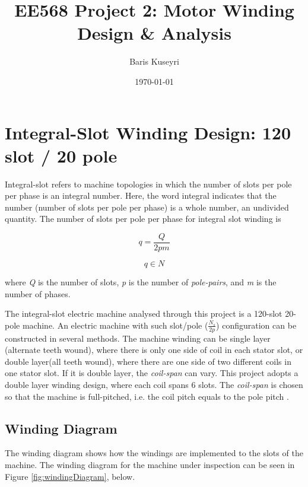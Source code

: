 \documentclass[a4paper, 11pt]{article}
\begin{document}
\title{EE568 Project 2: Motor Winding Design \& Analysis}
\author{Baris Kuseyri}
\date{\today}
\maketitle

\tableofcontents
\newpage


\section{Integral-Slot Winding Design: 120 slot / 20 pole}

Integral-slot refers to machine topologies in which the number of slots per pole per phase is an integral number. Here, the word integral indicates that the number (number of slots per pole per phase) is a whole number, an undivided quantity. The number of slots per pole per phase for integral slot winding is

\begin{equation}
q=\frac{Q}{2pm}
\end{equation}

\begin{equation}
q\in N
\end{equation}

where \textit{Q} is the number of slots, \textit{p} is the number of \textit{pole-pairs}, and \textit{m} is the number of phases.

The integral-slot electric machine analysed through this project is a 120-slot 20-pole machine. An electric machine with such slot/pole ($\frac{N_s}{2p}$) configuration can be constructed in several methods. The machine winding can be single layer (alternate teeth wound), where there is only one side of coil in each stator slot, or double layer(all teeth wound), where there are one side of two different coils in one stator slot. If it is double layer, the \textit{coil-span} can vary. This project adopts a double layer winding design, where each coil spans 6 slots. The \textit{coil-span} is chosen so that the machine is full-pitched, i.e. the coil pitch equals to the pole pitch \cite{ishak}.

\subsection{Winding Diagram}

The winding diagram shows how the windings are implemented to the slots of the machine. The winding diagram for the machine under inspection can be seen in Figure \ref{fig:windingDiagram}, below.
\end{document}

